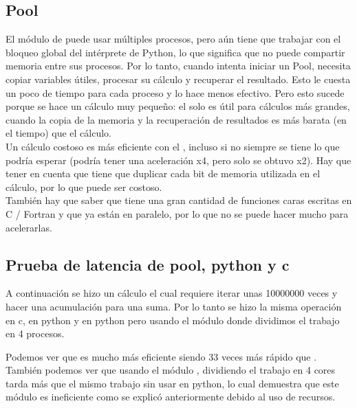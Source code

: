 \subsection{Pool}
    El módulo de  puede usar múltiples procesos, pero aún
    tiene que trabajar con el bloqueo global del intérprete de Python, lo que
    significa que no puede compartir memoria entre sus procesos. Por lo tanto,
    cuando intenta iniciar un Pool, necesita copiar variables útiles, procesar
    su cálculo y recuperar el resultado. Esto le cuesta un poco de tiempo para
    cada proceso y lo hace menos efectivo. Pero esto sucede porque se hace
    un cálculo muy pequeño: el  solo es útil para cálculos
    más grandes, cuando la copia de la memoria y la recuperación de resultados
    es más barata (en el tiempo) que el cálculo.\\

    Un cálculo costoso es más eficiente con el , incluso
    si no siempre se tiene lo que podría esperar (podría tener una aceleración x4,
    pero solo se obtuvo x2). Hay que tener en cuenta que  tiene que
    duplicar cada bit de memoria utilizada en el cálculo, por lo que puede ser
    costoso.\\
    También hay que saber que  tiene una gran cantidad de funciones
    caras escritas en C / Fortran y que ya están en paralelo, por lo que no
    se puede hacer mucho para acelerarlas.
\subsection{Prueba de latencia de pool, python y c}
    A continuación se hizo un cálculo el cual requiere iterar unas 10000000 veces
    y hacer una acumulación para una suma. Por lo tanto se hizo la misma operación
    en c, en python y en python pero usando el módulo  donde dividimos el
    trabajo en 4 procesos.
    \def\text{tiempos de la pruebas en segundos}
    \def\path{test_pool.png}
    \def\scale{.6}
    
    Podemos ver que  es mucho más eficiente siendo 33 veces más rápido que
    . También podemos ver que usando el módulo , dividiendo
    el trabajo en 4 cores tarda más que el mismo trabajo sin usar 
    en python, lo cual demuestra que este módulo es ineficiente como se explicó
    anteriormente debido al uso de recursos.
